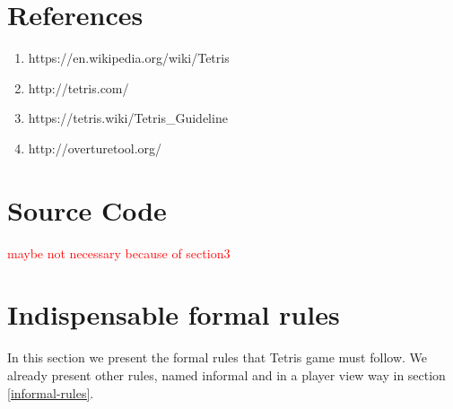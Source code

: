 \documentclass[a4paper]{article}
\begin{document}
\section{References}

\begin{enumerate}
	
\item https://en.wikipedia.org/wiki/Tetris
\item http://tetris.com/
\item https://tetris.wiki/Tetris\_Guideline
\item http://overturetool.org/

\end{enumerate}

\newpage
\appendix
\section{Source Code}
\textcolor{red}{maybe not necessary because of section3}

\section{Indispensable formal rules}\label{rules}
In this section we present the formal rules that Tetris game must follow. We already present other rules, named informal and in a player view way in section \ref{informal-rules}.
\end{document}
